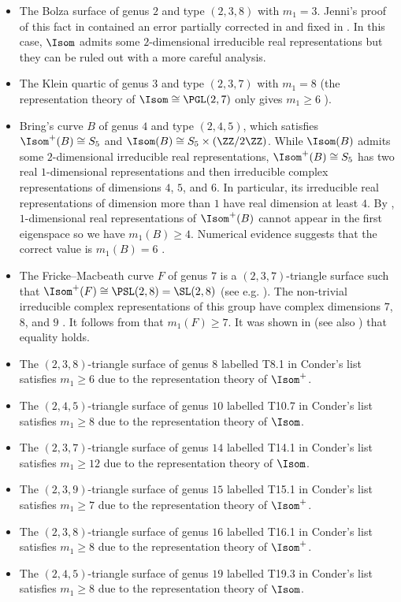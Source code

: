 \documentclass[12pt]{amsart}
\numberwithin{equation}{section}
\begin{document}
\begin{itemize}
\item The Bolza surface of genus $2$ and type $(2,3,8)$ with $m_1=3$. Jenni's proof of this fact in \cite{Jenni} contained an error partially corrected in \cite{Cook} and fixed in \cite{Klein}. In this case, $\Isom$ admits some $2$-dimensional irreducible real representations but they can be ruled out with a more careful analysis. 
\item The Klein quartic of genus $3$ and type $(2,3,7)$ with $m_1=8$ \cite{Klein} (the representation theory of $\Isom \cong \PGL(2,7)$ only gives $m_1\geq 6$ \cite{Cook}).
\item Bring's curve $B$ of genus $4$ and type $(2,4,5)$, which satisfies $\Isom^+(B) \cong S_5$ and $\Isom(B) \cong S_5 \times (\ZZ/2\ZZ)$. While $\Isom(B)$ admits some $2$-dimensional irreducible real representations, $\Isom^+(B) \cong S_5$ has two real $1$-dimensional representations and then irreducible complex representations of dimensions $4$, $5$, and $6$. In particular, its irreducible real representations of dimension more than $1$ have real dimension at least $4$. By , $1$-dimensional real representations of $\Isom^+(B)$ cannot appear in the first eigenspace so we have $m_1(B) \geq 4$. Numerical evidence suggests that the correct value is $m_1(B)=6$ \cite{Cook}.

\item The Fricke--Macbeath curve $F$ of genus $7$ is a $(2,3,7)$-triangle surface such that $\Isom^+(F) \cong \PSL(2,8) = \SL(2,8)$ (see e.g. \cite{Singerman}). The non-trivial irreducible complex representations of this group have complex dimensions $7$, $8$, and $9$ \cite{CharTables}. It follows from  that $m_1(F) \geq 7$. It was shown in \cite{Lee} (see also \cite{Pineault}) that equality holds.

\item The $(2,3,8)$-triangle surface of genus $8$ labelled T8.1 in Conder's list satisfies $m_1 \geq 6$ due to the representation theory of $\Isom^+$. 

\item The $(2,4,5)$-triangle surface of genus $10$ labelled T10.7 in Conder's list satisfies $m_1 \geq 8$ due to the representation theory of $\Isom$. 

\item The $(2,3,7)$-triangle surface of genus $14$ labelled T14.1 in Conder's list satisfies $m_1 \geq 12$ due to the representation theory of $\Isom$. 

\item The $(2,3,9)$-triangle surface of genus $15$ labelled T15.1 in Conder's list satisfies $m_1 \geq 7$ due to the representation theory of $\Isom^+$. 

\item The $(2,3,8)$-triangle surface of genus $16$ labelled T16.1 in Conder's list satisfies $m_1 \geq 8$ due to the representation theory of $\Isom^+$. 

\item The $(2,4,5)$-triangle surface of genus $19$ labelled T19.3 in Conder's list satisfies $m_1 \geq 8$ due to the representation theory of $\Isom$. 
\end{itemize}
\end{document}
